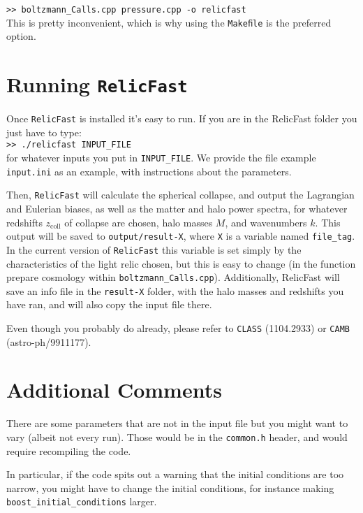 \documentclass[prd, notitlepage, nofootinbib, 10pt]{revtex4-1}
\begin{document}
\texttt{>> boltzmann\_Calls.cpp pressure.cpp -o relicfast}\\

This is pretty inconvenient, which is why using the \texttt{Makeﬁle} is the preferred option.

\section{Running \texttt{RelicFast}}

Once \texttt{RelicFast} is installed it’s easy to run. If you are in the RelicFast folder you just have to type: \\

\texttt{>> ./relicfast INPUT\_FILE}\\

for whatever inputs you put in \texttt{INPUT\_FILE}. We provide the ﬁle example \texttt{input.ini} as an example, with instructions about the parameters.

Then, \texttt{RelicFast} will calculate the spherical collapse, and output the Lagrangian and Eulerian biases, as well as the matter and halo power spectra, for whatever redshifts $z_{\textrm{coll}}$ of collapse are chosen, halo masses $M$, and wavenumbers $k$. This output will be saved to \texttt{output/result-X}, where \texttt{X} is a variable named \texttt{file\_tag}. In the current version of \texttt{RelicFast} this variable is set simply by the characteristics of the light relic chosen, but this is easy to change (in the function prepare cosmology within \texttt{boltzmann\_Calls.cpp}). Additionally, RelicFast will save an info ﬁle in the \texttt{result-X} folder, with the halo masses and redshifts you have ran, and will also copy the input ﬁle there.

Even though you probably do already, please refer to \texttt{CLASS} (1104.2933) or \texttt{CAMB} (astro-ph/9911177).

\section{Additional Comments} 

There are some parameters that are not in the input ﬁle but you might want to vary (albeit not every run). Those would be in the \texttt{common.h} header, and would require recompiling the code.

In particular, if the code spits out a warning that the initial conditions are too narrow, you might have to change the initial conditions, for instance making \texttt{boost\_initial\_conditions} larger.
\end{document}
